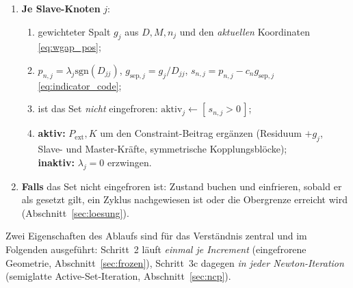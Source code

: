\documentclass[a4paper,11pt]{article}
\def\bm#1{#1}%
\def\tilde#1{#1}%
\begin{document}
\begin{center}
{\begin{minipage}{0.94\linewidth}
\begin{enumerate}
\begin{enumerate}
      \item Knotengewichte $\tilde D_{jj}\leftarrow$ Zeilensummen von $\bm D$
            \eqref{eq:rowsum_is_weight}; Besetzungsmuster \emph{und} Werte je Zeile
            zwischenspeichern (die Geometrie ist für das ganze Increment fest);
      \item Active-Set-Zustand zurücksetzen: nicht eingefroren, Stabilitätszähler $0$,
            Zustandshistorie leer.
    \end{enumerate}
    \textbf{Sonst:} Iterationszähler erhöhen.
  \item \textbf{Je Slave-Knoten} $j$:
    \begin{enumerate}\itemsep1pt
      \item gewichteter Spalt $\tilde g_j$ aus $\bm D,\bm M,\bm n_j$ und den \emph{aktuellen}
            Koordinaten \eqref{eq:wgap_pos};
      \item $p_{n,j}=\lambda_j\mathrm{sgn}(\tilde D_{jj})$,
            $g_{\text{sep},j}=\tilde g_j/\tilde D_{jj}$, $s_{n,j}=p_{n,j}-c_n g_{\text{sep},j}$
            \eqref{eq:indicator_code};
      \item ist das Set \emph{nicht} eingefroren: $\text{aktiv}_j \leftarrow [\,s_{n,j}>0\,]$;
      \item \textbf{aktiv:} $\bm P_{\text{ext}},\bm K$ um den Constraint-Beitrag ergänzen
            (Residuum $+\tilde g_j$, Slave- und Master-Kräfte, symmetrische Kopplungsblöcke);\\
            \textbf{inaktiv:} $\lambda_j=0$ erzwingen.
    \end{enumerate}
  \item \textbf{Falls} das Set nicht eingefroren ist: Zustand buchen und einfrieren, sobald er als
        gesetzt gilt, ein Zyklus nachgewiesen ist oder die Obergrenze erreicht wird
        (Abschnitt~\ref{sec:loesung}).
\end{enumerate}
\end{minipage}}
\end{center}

\noindent Zwei Eigenschaften des Ablaufs sind für das Verständnis zentral und im Folgenden
ausgeführt: Schritt~2 läuft \emph{einmal je Increment} (eingefrorene Geometrie,
Abschnitt~\ref{sec:frozen}), Schritt~3c dagegen \emph{in jeder Newton-Iteration}
(semiglatte Active-Set-Iteration, Abschnitt~\ref{sec:ncp}).
\end{document}
